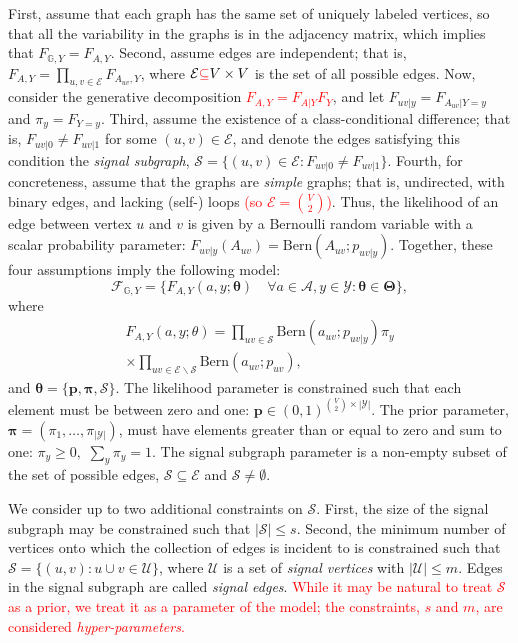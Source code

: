 \documentclass[10pt,journal,cspaper,compsoc]{IEEEtran}
\providecommand{\tr}[1]{\textcolor{red}{#1}}
\providecommand{\ve}[1]{\boldsymbol{#1}}
\newcommand{\GG}{\mathbb{G}}
\newcommand{\bth}{\ve{\theta}}
\newcommand{\bTh}{\ve{\Theta}}
\providecommand{\mc}[1]{\mathcal{#1}}
\providecommand{\mb}[1]{\boldsymbol{#1}}
\begin{document}
First,  assume that each graph has the same set of uniquely labeled vertices, so that all the variability in the graphs is in the adjacency matrix, which implies that $F_{\GG,Y}=F_{A,Y}$. Second, assume edges are independent; that is, $F_{A,Y}=\prod_{u,v \in \mc{E}} F_{A_{uv},Y}$, where 
$\mc{E} \tr{\subseteq} V \times V$ is the set of all possible edges.  Now, consider the generative decomposition \tr{$F_{A,Y}=F_{A|Y} F_Y$}, and let $F_{uv|y}=F_{A_{uv} | Y=y}$ and $\pi_y=F_{Y=y}$.  Third, assume the existence of a class-conditional difference; that is, $F_{uv|0} \neq F_{uv|1}$ for some $(u,v) \in \mc{E}$, and denote the edges satisfying this condition  the \emph{signal subgraph}, $\mc{S}=\{(u,v) \in \mc{E}: F_{uv|0} \neq F_{uv|1}\}$.  Fourth, for concreteness, assume that the graphs are \emph{simple} graphs; that is, undirected, with binary edges, and lacking (self-) loops \tr{(so $\mc{E}=\binom{V}{2}$)}.  Thus, the likelihood of an edge between vertex $u$ and $v$ is given by a Bernoulli random variable with a scalar probability parameter:  $F_{uv|y}(A_{uv})=\text{Bern}(A_{uv}; p_{uv|y})$. Together, these four assumptions imply the following model: 
\begin{equation}
\mc{F}_{\GG,Y}=\{F_{A, Y}(a,y; \bth) \quad \forall a\in\mc{A},y\in\mc{Y}: \bth \in \bTh\},
\end{equation} 
where
\begin{multline} \label{eq:model}
F_{A,Y}(a,y; \theta) =  \prod_{uv \in \mc{S}} \text{Bern}(a_{uv}; p_{uv|y})  \pi_y 
\\ \times \prod_{uv \in \mc{E} \backslash \mc{S}} \text{Bern}(a_{uv}; p_{uv}),
\end{multline}
and $\bth=\{\mb{p},\mb{\pi},\mc{S}\}$. The likelihood parameter is constrained such that each element must be between zero and one: $\mb{p}\in (0,1)^{\binom{V}{2} \times |\mc{Y}|}$.  The prior parameter, $\mb{\pi}=(\pi_1, \ldots, \pi_{|\mc{Y}|})$, must have elements greater than or equal to zero and sum to one: $\pi_y \geq 0,$ $\sum_y \pi_y=1$.  The signal subgraph parameter is a non-empty subset of the set of possible edges, $\mc{S} \subseteq \mc{E}$ and $\mc{S} \neq \emptyset$.

We consider up to two additional constraints on $\mc{S}$.  First, the size of the signal subgraph may be constrained such that $|\mc{S}| \leq s$. Second, the minimum number of vertices onto which the collection of edges is incident to is constrained such that $\mc{S}=\{(u,v): u \cup v \in \mc{U}\}$, where $\mc{U}$ is a set of \emph{signal vertices} with $|\mc{U}|\leq m$. Edges in the signal subgraph are called \emph{signal edges}. \tr{While it may be natural to treat $\mc{S}$ as a prior, we treat it as a parameter of the model; the constraints, $s$ and $m$, are considered \emph{hyper-parameters}.}
\end{document}
